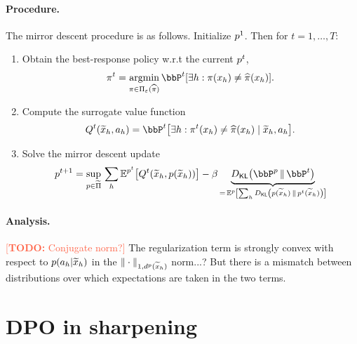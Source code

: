\documentclass{article}
\newcommand{\todo}[1]{\textcolor{Tomato}{[\textbf{TODO:} {#1}]}}
\let\oldparagraph\paragraph
\renewcommand{\paragraph}[1]{\oldparagraph{#1.}}
\begin{document}
\paragraph{Procedure} 
The mirror descent procedure is as follows. 
Initialize $p^{1}$. Then for $t = 1,\ldots,T$: 
\begin{enumerate}
  \item Obtain the best-response policy w.r.t the current $p^{t}$,
  \begin{align*}
    \pi\ind{t} = \argmin_{\pi\in\Pi_\veps(\pihat)}{}\bbP\ind{t}\sbr*{\exists h : \pi(x_h) \neq \pihat(x_h)}.
  \end{align*}
  \item Compute the surrogate value function 
  \begin{align*}
    Q\ind{t}(\wt{x}_h, a_h) 
    = 
    \bbP\ind{t}\sbr*{\exists h : \pi\ind{t}(x_h) \neq \pihat(x_h)\mid{}\wt{x}_h,a_h}.
  \end{align*}
  \item Solve the mirror descent update 
  \begin{align*}
    p\ind{t+1} 
    = 
    \sup_{p\in\wt\Pi}{} \sum_h \En^{p\ind{t}}\sbr*{Q\ind{t}(\wt{x}_h,p(\wt{x}_h))}
    - \beta \underbrace{\Dkl{\bbP^p}{\bbP\ind{t}}}_{={} \En^p\sbr*{\sum_h \Dkl{p(\wt{x}_h)}{p\ind{t}(\wt{x}_h)}}}
  \end{align*}
\end{enumerate}

\paragraph{Analysis} 
\todo{Conjugate norm?}
The regularization term is strongly convex with respect to $p(a_h|\widetilde{x}_h)$ in the $\|\cdot\|_{1,d^p(\widetilde{x}_h)}$ norm...? But there is a mismatch between distributions over which expectations are taken in the two terms. 


\newpage 

\section{DPO in sharpening}


\newpage 




% 
\end{document}
